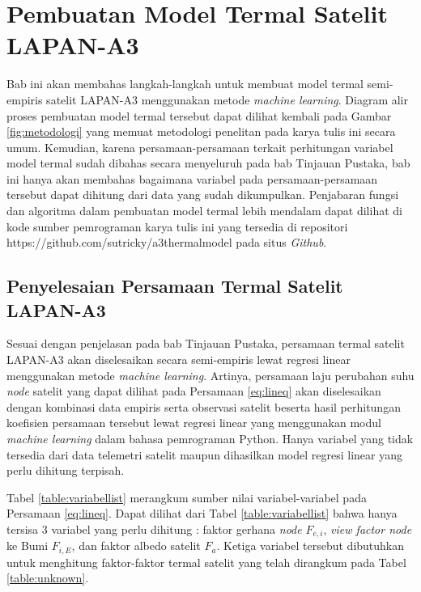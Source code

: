 \chapter{Pembuatan Model Termal Satelit LAPAN-A3}

Bab ini akan membahas langkah-langkah untuk membuat model termal semi-empiris
satelit LAPAN-A3 menggunakan metode \textit{machine learning}. Diagram alir
proses pembuatan model termal tersebut dapat dilihat kembali pada Gambar
\ref{fig:metodologi} yang memuat metodologi penelitan pada karya tulis ini
secara umum. Kemudian, karena persamaan-persamaan terkait perhitungan variabel
model termal sudah dibahas secara menyeluruh pada bab Tinjauan Pustaka, bab ini
hanya akan membahas bagaimana variabel pada persamaan-persamaan tersebut dapat
dihitung dari data yang sudah dikumpulkan. Penjabaran fungsi dan algoritma
dalam pembuatan model termal lebih mendalam dapat dilihat di kode sumber
pemrograman karya tulis ini yang tersedia di repositori
https://github.com/sutricky/a3thermalmodel pada situs \textit{Github}.

\section{Penyelesaian Persamaan Termal Satelit LAPAN-A3}

Sesuai dengan penjelasan pada bab Tinjauan Pustaka, persamaan termal satelit
LAPAN-A3 akan diselesaikan secara semi-empiris lewat regresi linear menggunakan
metode \textit{machine learning}. Artinya, persamaan laju perubahan suhu
\textit{node} satelit yang dapat dilihat pada Persamaan \ref{eq:lineq} akan
diselesaikan dengan kombinasi data empiris serta observasi satelit beserta hasil
perhitungan koefisien persamaan tersebut lewat regresi linear yang menggunakan
modul \textit{machine learning} dalam bahasa pemrograman Python. Hanya variabel
yang tidak tersedia dari data telemetri satelit maupun dihasilkan model regresi
linear yang perlu dihitung terpisah. 

Tabel \ref{table:variabellist} merangkum sumber nilai variabel-variabel pada
Persamaan \ref{eq:lineq}. Dapat dilihat dari Tabel \ref{table:variabellist}
bahwa hanya tersisa 3 variabel yang perlu dihitung : faktor gerhana
\textit{node} $F_{e,i}$, \textit{view factor node} ke Bumi $F_{i,E}$, dan
faktor albedo satelit $F_{a}$. Ketiga variabel tersebut dibutuhkan untuk
menghitung faktor-faktor termal satelit yang telah dirangkum pada Tabel
\ref{table:unknown}.

